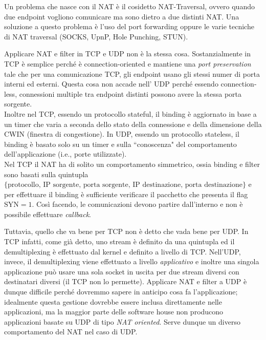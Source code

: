Un problema che nasce con il NAT è il cosidetto NAT-Traversal, ovvero quando due endpoint vogliono comunicare ma sono dietro a due distinti NAT. Una soluzione a questo problema è l'uso del port forwarding oppure le varie tecniche di NAT traversal (SOCKS, UpnP, Hole Punching, STUN). 

Applicare NAT e filter in TCP e UDP non è la stessa cosa. Sostanzialmente in TCP è semplice perché è connection-oriented e mantiene una \textit{port preservation} tale che per una comunicazione TCP, gli endpoint usano gli stessi numer di porta interni ed esterni. Questa cosa non accade nell' UDP perché essendo connection-less, connessioni multiple tra endpoint distinti possono avere la stessa porta sorgente. \\
Inoltre nel TCP, essendo un protocollo stateful, il binding è aggiornato in base a un timer che varia a seconda dello stato della connessione e della dimensione della CWIN (finestra di congestione). In UDP, essendo un protocollo stateless, il binding è basato solo su un timer e sulla \textquotedblleft conoscenza" del comportamento dell'applicazione (i.e., porte utilizzate).\\
Nel TCP il NAT ha di solito un comportamento simmetrico, ossia binding e filter sono basati sulla quintupla $\{\text{protocollo, IP sorgente, porta sorgente, IP destinazione, porta destinazione}\}$ e per effettuare il binding è sufficiente verificare il pacchetto che presenta il flag $\text{SYN} = 1$. Così facendo, le comunicazioni devono partire dall'interno e non è possibile effettuare \textit{callback}.

Tuttavia, quello che va bene per TCP non è detto che vada bene per UDP. In TCP infatti, come già detto, uno stream è definito da una quintupla ed il demultiplexing è effettuato dal kernel e definito a livello di TCP. Nell'UDP, invece, il demultiplexing viene effettuato a livello \textit{applicativo} e inoltre una singola applicazione può usare una sola socket in uscita per due stream diversi con destinatari diversi (il TCP non lo permette). Applicare NAT e filter a UDP è dunque difficile perché dovremmo sapere in anticipo cosa fa l'applicazione; idealmente questa gestione dovrebbe essere inclusa direttamente nelle applicazioni, ma la maggior parte delle software house non producono applicazioni basate su UDP di tipo \textit{NAT oriented}. Serve dunque un diverso comportamento del NAT nel caso di UDP.

